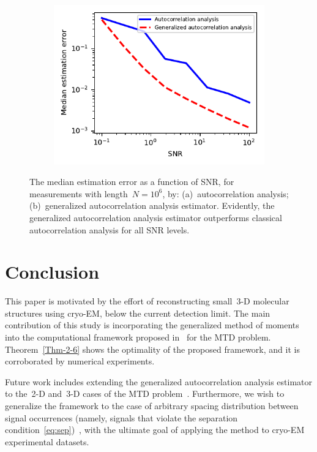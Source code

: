 \documentclass{article}
\begin{document}
\begin{figure}[!tb]
	\begin{subfigure}[ht]{\columnwidth}
		\centering
		\includegraphics[width=0.8\columnwidth, keepaspectratio]{figures/experiment_SNR_err.pdf}
	\end{subfigure}
	\caption{The median estimation error as a function of SNR, for measurements with length~\mbox{$N = 10^6$}, by: (a)~autocorrelation analysis; (b)~generalized autocorrelation analysis estimator. Evidently, the generalized autocorrelation analysis estimator outperforms classical autocorrelation analysis for all SNR levels.}
	\label{fig:err_noise_experiment}
\end{figure}

\section{Conclusion}
\label{sec:conclusion}
This paper is motivated by the effort of reconstructing small~\mbox{3-D} molecular structures using \mbox{cryo-EM}, below the current detection limit. The main contribution of this study is incorporating the generalized method of moments into the computational framework proposed in~\cite{bendory2018toward} for the MTD problem. Theorem~\ref{Thm-2-6} shows the optimality of the proposed framework, and it is corroborated by numerical experiments.

Future work includes extending the generalized autocorrelation analysis estimator to the~\mbox{2-D} and~\mbox{3-D} cases of the MTD problem~\cite{bendory2018toward}. Furthermore, we wish to generalize the framework to the case of arbitrary spacing distribution between signal occurrences (namely, signals that violate the separation condition~\eqref{eq:sep})~\cite{lan2020multi,kreymer2021two}, with the {ultimate} goal of applying the method to \mbox{cryo-EM} {experimental} datasets.

\vfill
\newpage



\end{document}
